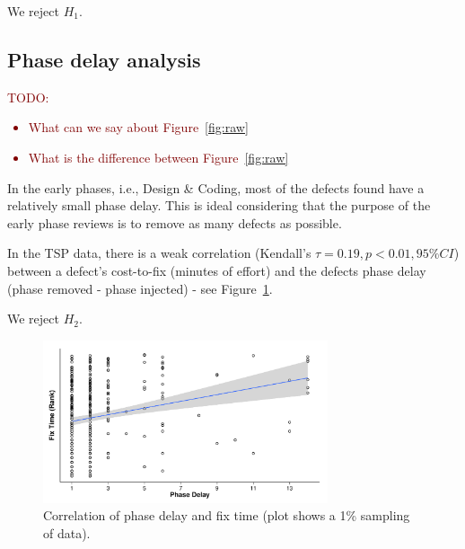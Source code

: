 \documentclass{sig-alternate}
\newcommand{\todo}[1]{\textcolor{Maroon}{TODO: #1}}
\newcommand{\bi}{\begin{itemize}[leftmargin=0.4cm]}
\newcommand{\ei}{\end{itemize}}
\newcommand{\fig}[1]{Figure~\ref{fig:#1}}
\begin{document}
We reject $H_1$.

\subsection{Phase delay analysis}
\todo{
\bi
    \item What can we say about \fig{raw}
    \item What is the difference between \fig{raw}
\ei
}

 In the early phases, i.e., Design \& Coding, most of the defects found have a relatively small phase delay. This is ideal considering that the purpose of the early phase reviews is to remove as many defects as possible. 

In the TSP data, there is a weak correlation (Kendall's $\tau = 0.19, p < 0.01, 95\% CI$) between a defect's cost-to-fix (minutes of effort) and the defects phase delay (phase removed - phase injected) - see \fig{correlation}. 

We reject $H_2$.




\begin{figure}[!ht]
\begin{center}
\includegraphics[width=3.3in]{corr.pdf}
\end{center}
\caption{Correlation of phase delay and fix time (plot shows a 1\% sampling of data).}
\label{fig:correlation}
\end{figure}

\end{document}
